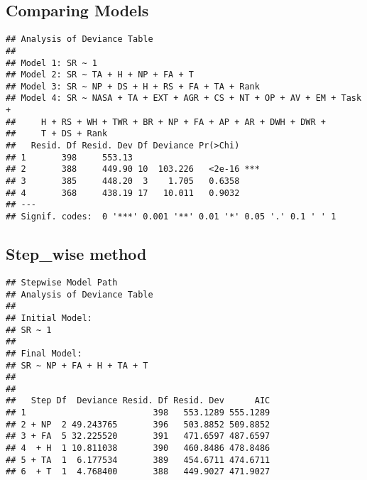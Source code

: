 \documentclass[]{article}
\begin{document}
\newpage

\hypertarget{comparing-models-1}{%
\subsection{Comparing Models}\label{comparing-models-1}}

\begin{verbatim}
## Analysis of Deviance Table
## 
## Model 1: SR ~ 1
## Model 2: SR ~ TA + H + NP + FA + T
## Model 3: SR ~ NP + DS + H + RS + FA + TA + Rank
## Model 4: SR ~ NASA + TA + EXT + AGR + CS + NT + OP + AV + EM + Task + 
##     H + RS + WH + TWR + BR + NP + FA + AP + AR + DWH + DWR + 
##     T + DS + Rank
##   Resid. Df Resid. Dev Df Deviance Pr(>Chi)    
## 1       398     553.13                         
## 2       388     449.90 10  103.226   <2e-16 ***
## 3       385     448.20  3    1.705   0.6358    
## 4       368     438.19 17   10.011   0.9032    
## ---
## Signif. codes:  0 '***' 0.001 '**' 0.01 '*' 0.05 '.' 0.1 ' ' 1
\end{verbatim}

\newpage

\hypertarget{step_wise-method}{%
\subsection{Step\_wise method}\label{step_wise-method}}

\begin{verbatim}
## Stepwise Model Path 
## Analysis of Deviance Table
## 
## Initial Model:
## SR ~ 1
## 
## Final Model:
## SR ~ NP + FA + H + TA + T
## 
## 
##   Step Df  Deviance Resid. Df Resid. Dev      AIC
## 1                         398   553.1289 555.1289
## 2 + NP  2 49.243765       396   503.8852 509.8852
## 3 + FA  5 32.225520       391   471.6597 487.6597
## 4  + H  1 10.811038       390   460.8486 478.8486
## 5 + TA  1  6.177534       389   454.6711 474.6711
## 6  + T  1  4.768400       388   449.9027 471.9027
\end{verbatim}
\end{document}
